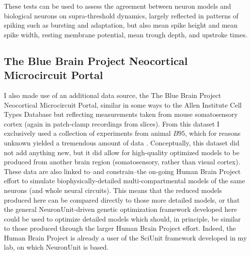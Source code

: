 
These tests can be used to assess the agreement between neuron models and biological neurons on supra-threshold dynamics, largely reflected in patterns of spiking such as bursting and adaptation, but also mean spike height and mean spike width, resting membrane potential, mean trough depth, and upstroke times.

\subsection{The Blue Brain Project Neocortical Microcircuit Portal}
\label{sec:bluebrain-data}
I also made use of an additional data source, the The Blue Brain Project Neocortical Microcircuit Portal, similar in some ways to the Allen Institute Cell Types Database but reflecting measurements taken from mouse somatosensory cortex (again in patch-clamp recordings from slices).
From this dataset I exclusively used a collection of experiments from animal $B95$, which for reasons unknown yielded a tremendous amount of data \citep{ramaswamy2015neocortical}.
Conceptually, this dataset did not add anything new, but it did allow for high-quality optimized models to be produced from another brain region (somatosensory, rather than visual cortex).
These data are also linked to--and constrain--the on-going Human Brain Project effort to simulate biophysically-detailed multi-compartmental models of the same neurons (and whole neural circuits).
This means that the reduced models produced here can be compared directly to those more detailed models, or that the general NeuronUnit-driven genetic optimization framework developed here could be used to optimize detailed models which should, in principle, be similar to those produced through the larger Human Brain Project effort.
Indeed, the Human Brain Project is already a user of the SciUnit framework developed in my lab, on which NeuronUnit is based.

